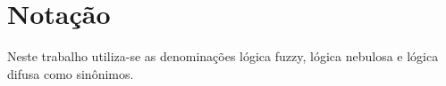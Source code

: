 %

\chapter*{Notação}

Neste trabalho utiliza-se as denominações lógica fuzzy, lógica nebulosa e lógica difusa como sinônimos.


